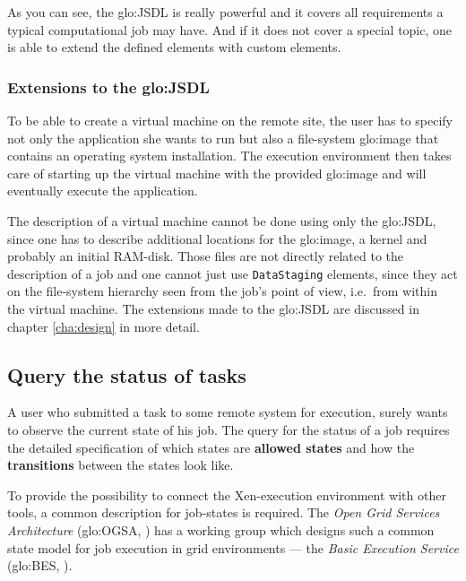 As you  can see, the \gls{glo:JSDL}  is really powerful and  it covers all
requirements  a typical computational  job may  have. And  if it  does not
cover a  special topic, one  is able to  extend the defined  elements with
custom elements.

\subsubsection{Extensions to the \gls{glo:JSDL}}

To be able to create a virtual machine on the remote site, the user has to
specify not only  the application she wants to run  but also a file-system
\gls{glo:image}  that  contains  an  operating system  installation.   The
execution environment then  takes care of starting up  the virtual machine
with  the  provided  \gls{glo:image}   and  will  eventually  execute  the
application.

The  description  of a  virtual  machine cannot  be  done  using only  the
\gls{glo:JSDL},  since one has  to describe  additional locations  for the
\gls{glo:image}, a  kernel and probably an initial  RAM-disk.  Those files
are not directly  related to the description of a job  and one cannot just
use  \texttt{DataStaging}  elements, since  they  act  on the  file-system
hierarchy seen from the job's  point of view, i.e.~from within the virtual
machine.   The extensions  made  to the  \gls{glo:JSDL}  are discussed  in
chapter \ref{cha:design} in more detail.

\subsection{Query the status of tasks}
\label{sec:status-query}

A user  who submitted a task  to some remote system  for execution, surely
wants to observe the current state of his job. The query for the status of
a   job  requires  the   detailed  specification   of  which   states  are
\textbf{allowed  states}  and  how  the \textbf{transitions}  between  the
states look like.

To provide  the possibility to connect the  Xen-execution environment with
other  tools,  a  common  description  for job-states  is  required.   The
\emph{Open Grid Services Architecture} (\gls{glo:OGSA}, \cite{ogsa}) has a
working group which designs such a common state model for job execution in
grid environments  --- the \emph{Basic  Execution Service} (\gls{glo:BES},
\cite{ogsa-bes}).

